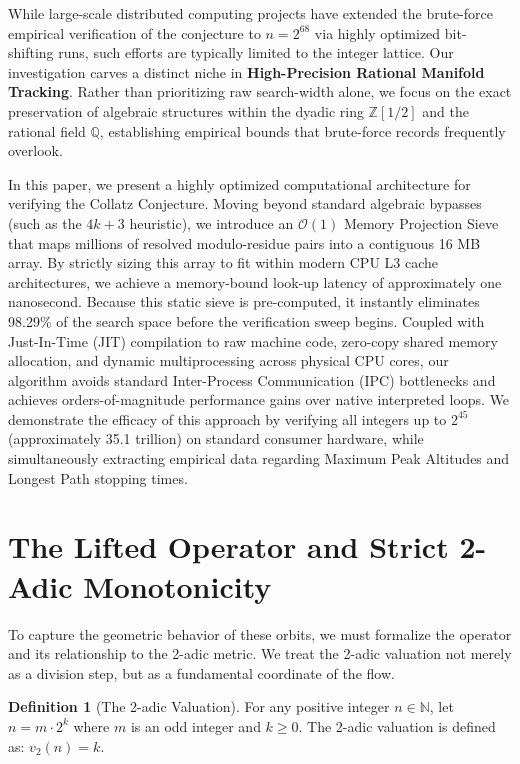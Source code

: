 \documentclass[11pt, a4paper]{article}
\theoremstyle{definition}
\newtheorem{definition}[theorem]{Definition}
\begin{document}
While large-scale distributed computing projects have extended the brute-force empirical verification of the conjecture to $n = 2^{68}$ via highly optimized bit-shifting runs, such efforts are typically limited to the integer lattice. Our investigation carves a distinct niche in \textbf{High-Precision Rational Manifold Tracking}. Rather than prioritizing raw search-width alone, we focus on the exact preservation of algebraic structures within the dyadic ring $\mathbb{Z}[1/2]$ and the rational field $\mathbb{Q}$, establishing empirical bounds that brute-force records frequently overlook.

In this paper, we present a highly optimized computational architecture for verifying the Collatz Conjecture. Moving beyond standard algebraic bypasses (such as the $4k+3$ heuristic), we introduce an $\mathcal{O}(1)$ Memory Projection Sieve that maps millions of resolved modulo-residue pairs into a contiguous 16 MB array. By strictly sizing this array to fit within modern CPU L3 cache architectures, we achieve a memory-bound look-up latency of approximately one nanosecond. Because this static sieve is pre-computed, it instantly eliminates 98.29\% of the search space before the verification sweep begins. Coupled with Just-In-Time (JIT) compilation to raw machine code, zero-copy shared memory allocation, and dynamic multiprocessing across physical CPU cores, our algorithm avoids standard Inter-Process Communication (IPC) bottlenecks and achieves orders-of-magnitude performance gains over native interpreted loops. We demonstrate the efficacy of this approach by verifying all integers up to $2^{45}$ (approximately 35.1 trillion) on standard consumer hardware, while simultaneously extracting empirical data regarding Maximum Peak Altitudes and Longest Path stopping times.

\section{The Lifted Operator and Strict 2-Adic Monotonicity}

To capture the geometric behavior of these orbits, we must formalize the operator and its relationship to the 2-adic metric. We treat the 2-adic valuation not merely as a division step, but as a fundamental coordinate of the flow.

\begin{definition}[The 2-adic Valuation]
For any positive integer $n\in\mathbb{N}$, let $n=m\cdot2^{k}$ where $m$ is an odd integer and $k\ge0$. The 2-adic valuation is defined as: $v_{2}(n)=k$.
\end{definition}
\end{document}
